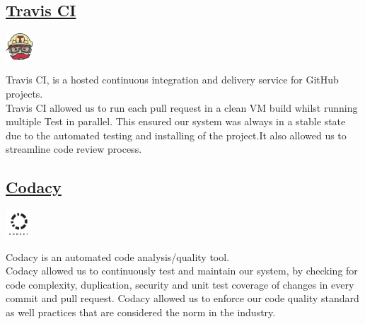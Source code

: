 \documentclass{article}
\begin{document}
		\begin{minipage}[b]{0.20\linewidth}
			\subsection{\href{https://travis-ci.org} {Travis CI}}
		\vspace{2mm}
		\end{minipage}
		\begin{minipage}[b]{0.80\linewidth}
			\includegraphics[width=1.0cm]{img/travis.jpg}
		\end{minipage}
		Travis CI, is a hosted continuous integration and delivery service for GitHub projects.\\	

		\noindent
		Travis CI allowed us to run each pull request in a clean VM build whilst running multiple Test in parallel.
		This ensured our system was always in a stable state due to the automated testing and installing of the				        project.It also allowed us to streamline code review process.\\

		\begin{minipage}[b]{0.20\linewidth}
			\subsection{\href{https://www.codacy.com}{Codacy}}
		\vspace{2mm}
		\end{minipage}
		\begin{minipage}[b]{0.80\linewidth}
			\includegraphics[width=1.0cm]{img/codacy.png}
		\end{minipage}
		Codacy is an automated code analysis/quality tool.\\
		
		\noindent
		Codacy allowed us to continuously test and maintain our system, by checking for code complexity,
		duplication, security and unit test coverage of changes in every commit and pull request.
		Codacy allowed us to enforce our code quality standard as well practices
		that are considered the norm in the industry.
		
\end{document}
